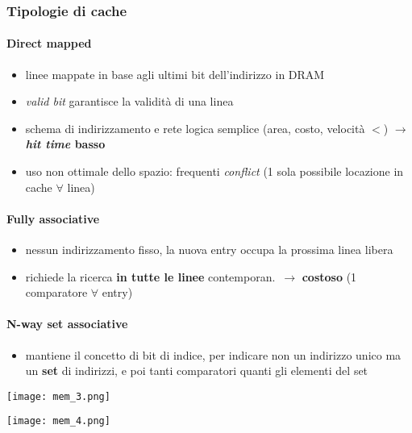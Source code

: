 \subsubsection{Tipologie di cache}

\paragraph{Direct mapped}

\begin{itemize}
  \item linee mappate in base agli ultimi bit dell'indirizzo in DRAM
  \item \textit{valid bit} garantisce la validit\`a di una linea
  \item schema di indirizzamento e rete logica semplice (area, costo, velocit\`a $<$) $\rightarrow$ \textbf{\textit{hit time} basso}
  \item uso non ottimale dello spazio: frequenti \textit{conflict} (1 sola possibile locazione in cache $\forall$ linea)
\end{itemize}

\paragraph{Fully associative}

\begin{itemize}
  \item nessun indirizzamento fisso, la nuova entry occupa la prossima linea libera
  \item richiede la ricerca \textbf{in tutte le linee} contemporan.~$\rightarrow$ \textbf{costoso} (1 comparatore $\forall$ entry)
\end{itemize}

\paragraph{N-way set associative}

\begin{itemize}
  \item mantiene il concetto di bit di indice, per indicare non un indirizzo unico ma un \textbf{set} di indirizzi, e poi tanti comparatori quanti gli elementi del set 
\end{itemize}

\noindent
\begin{minipage}[b]{.4\textwidth}
  \texttt{[image: mem\_3.png]}
\end{minipage}
\hfill
\begin{minipage}[b]{.5\textwidth}
  \texttt{[image: mem\_4.png]}
\end{minipage}

